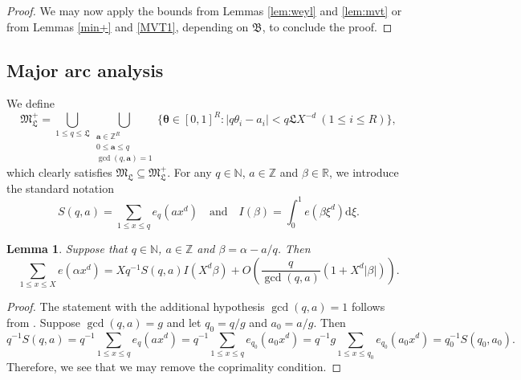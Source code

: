\documentclass[reqno, 12pt, reqno]{amsart}
\numberwithin{equation}{section}
\newtheorem{lemma}[theorem]{Lemma}
\newcommand{\ZZ}{\mathbb{Z}}
\newcommand{\NN}{\mathbb{N}}
\newcommand{\RR}{\mathbb{R}}
\renewcommand{\leq}{\leqslant}
\renewcommand{\a}{\mathbf{a}}
\renewcommand{\=}{\equiv}
\begin{document}
\begin{proof}
We may now apply the bounds from Lemmas \ref{lem:weyl} and \ref{lem:mvt} or from Lemmas \ref{min+} and \ref{MVT1}, depending on $\mathfrak{B}$,                                                                                                                                                                                                                                                                                                                                                                                                                                                                                                                                                                                                                                                                                                                                                                                                                                                            to conclude the proof.
\end{proof}


\subsection{Major arc analysis}
We define
$$
\mathfrak{M}_\mathfrak{L}^+ = \bigcup_{1 \leq q \leq  \mathfrak{L} } \bigcup_{ \substack{ \a \in \ZZ^{R} \\ 0 \leq \a \leq q  \\  \gcd(q, \a) = 1  }  }
\{ \boldsymbol{\theta} \in [0,1]^{R}: \vert q \theta_i - a_i \vert < q \mathfrak{L} X^{ - d} \ (1 \leq i \leq R) \},
$$
which clearly satisfies $\mathfrak{M}_\mathfrak{L} \subseteq \mathfrak{M}_\mathfrak{L}^+$. For any $q \in \NN$, $a \in \ZZ$ and $\beta \in \RR$, we introduce the standard notation
\[
S(q,a)  = \sum_{1 \leq x \leq q} e_q(ax^d)
\quad \text{and} \quad
I(\beta) = \int_0^1 e(\beta \xi^d) \mathrm{d}\xi.
\]


\begin{lemma}
\label{lem0}
Suppose that $q \in \NN$, $a \in \ZZ$ and $\beta = \alpha - a/q$.
Then
$$
\sum_{1 \leq x \leq X } e(\alpha x^d) = X q^{-1} S(q,a) I(X^d \beta) + O \left(  \frac{q}{\gcd(q,a)}  (1 +  X^d |\beta|)  \right).
$$
\end{lemma}
\begin{proof}
The statement with the additional hypothesis $\gcd(q,a) = 1$ follows from \cite[Theorem 4.1]{Vaughan}.
Suppose $\gcd(q, a) = g$ and let $q_0 = q/g$ and $a_0 = a/g$.
Then
$$
q^{-1} S(q,a) =  q^{-1} \sum_{1 \leq x \leq q} e_q (a x^d) =  q^{-1} \sum_{1 \leq x \leq q} e_{q_0} (a_0 x^d) = q^{-1} g  \sum_{1 \leq x \leq q_0} e_{q_0} (a_0 x^d) =
q_0^{-1} S(q_0, a_0).
$$
Therefore, we see that we may remove the coprimality condition.
\end{proof}
\end{document}
